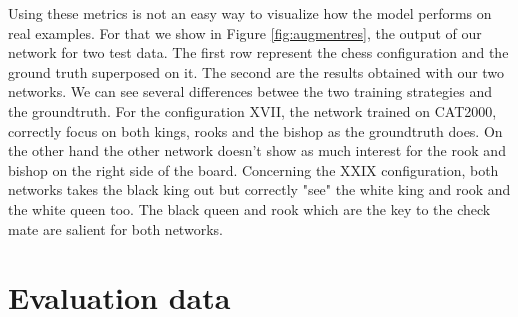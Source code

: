 Using these metrics is not an easy way to visualize how the model performs on real examples. For that we show in Figure \ref{fig:augmentres}, the output of our network for two test data. The first row represent the chess configuration and the ground truth superposed on it. The second are the results obtained with our two networks. We can see several differences betwee the two training strategies and the groundtruth. For the configuration XVII, the network trained on CAT2000, correctly focus on both kings, rooks and the bishop as the groundtruth does. On the other hand the other network doesn't show as much interest for the rook and bishop on the right side of the board. Concerning the XXIX configuration, both networks takes the black king out but correctly "see" the white king and rook and the white queen too. The black queen and rook which are the key to the check mate are salient for both networks. 

\section{Evaluation data}


